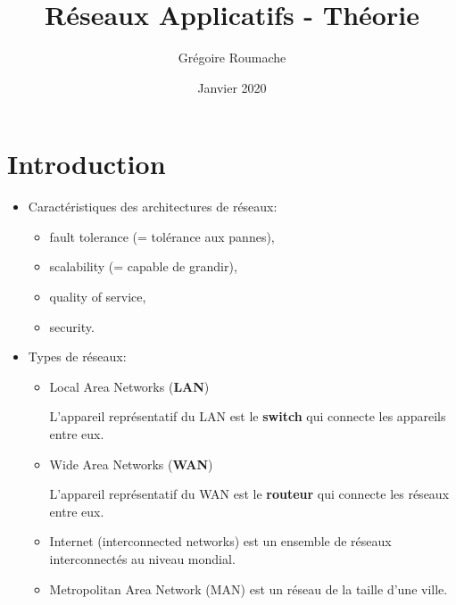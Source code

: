 \documentclass[a4paper]{article}
\title{Réseaux Applicatifs - Théorie}
\author{Grégoire Roumache}
\date{Janvier 2020}
\begin{document}
\maketitle















\section{Introduction}





\begin{itemize}





\item Caractéristiques des architectures de réseaux:
\begin{itemize}
    \item fault tolerance (= tolérance aux pannes),
    \item scalability (= capable de grandir),
    \item quality of service,
    \item security.
\end{itemize}





\item Types de réseaux:
\begin{itemize}
    \item Local Area Networks (\textbf{LAN})
    \begin{example}
        L'appareil représentatif du LAN est le \textbf{switch} qui connecte les appareils entre eux.
    \end{example}
    \item Wide Area Networks (\textbf{WAN})
    \begin{example}
        L'appareil représentatif du WAN est le \textbf{routeur} qui connecte les réseaux entre eux.
    \end{example}
    \item Internet (interconnected networks) est un ensemble de réseaux interconnectés au niveau mondial.
    \item Metropolitan Area Network (MAN) est un réseau de la taille d'une ville.
\end{itemize}






\end{itemize}
\end{document}
